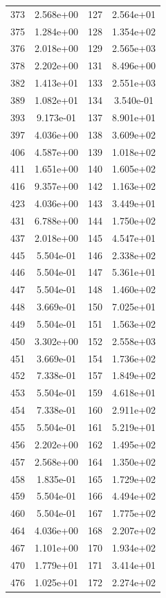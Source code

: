 \documentclass[12pt]{article}
\begin{document}
\begin{longtable}{@{}cccc@{}}
373 & 2.568e+00 & 127 & 2.564e+01 \\
375 & 1.284e+00 & 128 & 1.354e+02 \\
376 & 2.018e+00 & 129 & 2.565e+03 \\
378 & 2.202e+00 & 131 & 8.496e+00 \\
382 & 1.413e+01 & 133 & 2.551e+03 \\
389 & 1.082e+01 & 134 & 3.540e-01 \\
393 & 9.173e-01 & 137 & 8.901e+01 \\
397 & 4.036e+00 & 138 & 3.609e+02 \\
406 & 4.587e+00 & 139 & 1.018e+02 \\
411 & 1.651e+00 & 140 & 1.605e+02 \\
416 & 9.357e+00 & 142 & 1.163e+02 \\
423 & 4.036e+00 & 143 & 3.449e+01 \\
431 & 6.788e+00 & 144 & 1.750e+02 \\
437 & 2.018e+00 & 145 & 4.547e+01 \\
445 & 5.504e-01 & 146 & 2.338e+02 \\
446 & 5.504e-01 & 147 & 5.361e+01 \\
447 & 5.504e-01 & 148 & 1.460e+02 \\
448 & 3.669e-01 & 150 & 7.025e+01 \\
449 & 5.504e-01 & 151 & 1.563e+02 \\
450 & 3.302e+00 & 152 & 2.558e+03 \\
451 & 3.669e-01 & 154 & 1.736e+02 \\
452 & 7.338e-01 & 157 & 1.849e+02 \\
453 & 5.504e-01 & 159 & 4.618e+01 \\
454 & 7.338e-01 & 160 & 2.911e+02 \\
455 & 5.504e-01 & 161 & 5.219e+01 \\
456 & 2.202e+00 & 162 & 1.495e+02 \\
457 & 2.568e+00 & 164 & 1.350e+02 \\
458 & 1.835e-01 & 165 & 1.729e+02 \\
459 & 5.504e-01 & 166 & 4.494e+02 \\
460 & 5.504e-01 & 167 & 1.775e+02 \\
464 & 4.036e+00 & 168 & 2.207e+02 \\
467 & 1.101e+00 & 170 & 1.934e+02 \\
470 & 1.779e+01 & 171 & 3.414e+01 \\
476 & 1.025e+01 & 172 & 2.274e+02 \\

\end{longtable}
\end{document}
